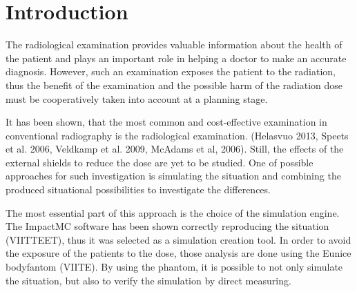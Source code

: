 \documentclass[fleqn,10pt]{SelfArx} %
\affiliation{\textsuperscript{1}\textit{Tekijä}} %
\affiliation{\textsuperscript{2}\textit{Superviser}}
\begin{document}
\flushbottom %

\maketitle %

\tableofcontents %

\thispagestyle{empty} %


\section*{Introduction} %



The radiological examination provides valuable information about the health of the patient and plays an important role in helping a doctor to make an accurate diagnosis. However, such an examination exposes the patient to the radiation, thus the benefit of the examination and the possible harm of the radiation dose must be cooperatively taken into account at a planning stage. 

It has been shown, that the most common and cost-effective examination in conventional radiography is the radiological examination. (Helasvuo 2013, Speets et al. 2006, Veldkamp et al. 2009, McAdams et al, 2006). Still, the effects of the external shields to reduce the dose are yet to be studied. One of possible approaches for such investigation is simulating the situation and combining the produced situational possibilities to investigate the differences.


The most essential part of this approach is the choice of the simulation engine. The ImpactMC software has been shown correctly reproducing the situation (VIITTEET), thus it was selected as a simulation creation tool. In order to avoid the exposure of the patients to the dose, those analysis are done using the Eunice bodyfantom (VIITE). By using the phantom, it is possible to not only simulate the situation, but also to verify the simulation by direct measuring.
\end{document}

